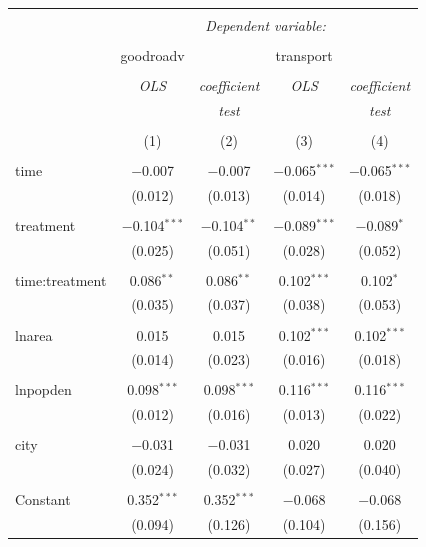 \documentclass{article}\usepackage[]{graphicx}\usepackage[]{color}
\begin{document}
\begin{table}[!htbp] \centering 
  \caption{} 
  \label{} 
\begin{tabular}{@{\extracolsep{5pt}}lcccc} 
\\[-1.8ex]\hline 
\hline \\[-1.8ex] 
 & \multicolumn{4}{c}{\textit{Dependent variable:}} \\ 
\cline{2-5} 
\\[-1.8ex] & goodroadv &   & transport &   \\ 
\\[-1.8ex] & \textit{OLS} & \textit{coefficient} & \textit{OLS} & \textit{coefficient} \\ 
 & \textit{} & \textit{test} & \textit{} & \textit{test} \\ 
\\[-1.8ex] & (1) & (2) & (3) & (4)\\ 
\hline \\[-1.8ex] 
 time & $-$0.007 & $-$0.007 & $-$0.065$^{***}$ & $-$0.065$^{***}$ \\ 
  & (0.012) & (0.013) & (0.014) & (0.018) \\ 
  & & & & \\ 
 treatment & $-$0.104$^{***}$ & $-$0.104$^{**}$ & $-$0.089$^{***}$ & $-$0.089$^{*}$ \\ 
  & (0.025) & (0.051) & (0.028) & (0.052) \\ 
  & & & & \\ 
 time:treatment & 0.086$^{**}$ & 0.086$^{**}$ & 0.102$^{***}$ & 0.102$^{*}$ \\ 
  & (0.035) & (0.037) & (0.038) & (0.053) \\ 
  & & & & \\ 
 lnarea & 0.015 & 0.015 & 0.102$^{***}$ & 0.102$^{***}$ \\ 
  & (0.014) & (0.023) & (0.016) & (0.018) \\ 
  & & & & \\ 
 lnpopden & 0.098$^{***}$ & 0.098$^{***}$ & 0.116$^{***}$ & 0.116$^{***}$ \\ 
  & (0.012) & (0.016) & (0.013) & (0.022) \\ 
  & & & & \\ 
 city & $-$0.031 & $-$0.031 & 0.020 & 0.020 \\ 
  & (0.024) & (0.032) & (0.027) & (0.040) \\ 
  & & & & \\ 
 Constant & 0.352$^{***}$ & 0.352$^{***}$ & $-$0.068 & $-$0.068 \\ 
  & (0.094) & (0.126) & (0.104) & (0.156) \\ 

\end{tabular}
\end{table}
\end{document}
